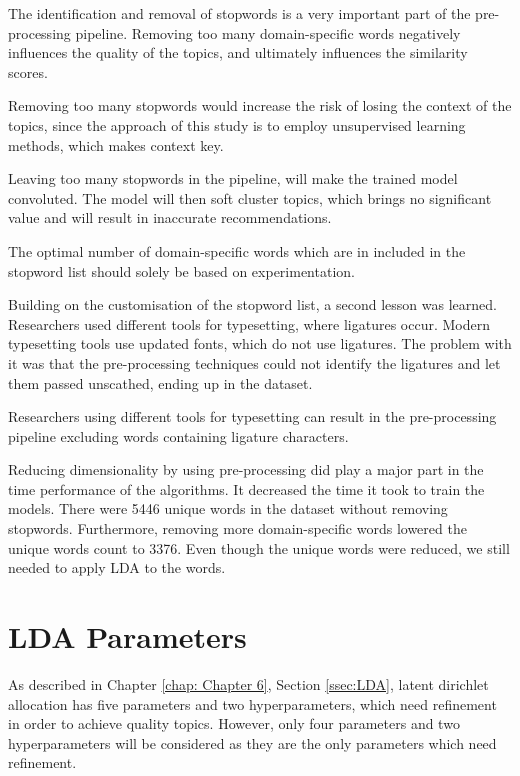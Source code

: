 \begin{lesson}
The identification and removal of stopwords is a very important part of the pre-processing pipeline. Removing too many domain-specific words negatively influences the quality of the topics, and ultimately influences the similarity scores.
\end{lesson}\label{L:goldilocks}

Removing too many stopwords would increase the risk of losing the context of the topics, since the approach of this study is to employ unsupervised learning methods, which makes context key.

Leaving too many stopwords in the pipeline, will make the trained model convoluted. The model will then soft cluster topics, which brings no significant value and will result in inaccurate recommendations.

The optimal number of domain-specific words which are in included in the stopword list should solely be based on experimentation.

Building on the customisation of the stopword list, a second lesson was learned. Researchers used different tools for typesetting, where ligatures occur. Modern typesetting tools use updated fonts, which do not use ligatures. The problem with it was that the pre-processing techniques could not identify the ligatures and let them passed unscathed, ending up in the dataset.

\begin{lesson}
Researchers using different tools for typesetting can result in the pre-processing pipeline excluding words containing ligature characters.
\end{lesson}\label{L:ligature}

Reducing dimensionality by using pre-processing did play a major part in the time performance of the algorithms. It decreased the time it took to train the models. There were 5446 unique words in the dataset without removing stopwords. Furthermore, removing more domain-specific words lowered the unique words count to 3376. Even though the unique words were reduced, we still needed to apply LDA to the words.

\section{LDA Parameters}

As described in Chapter \ref{chap: Chapter 6}, Section \ref{ssec:LDA}, latent dirichlet allocation has five parameters and two hyperparameters, which need refinement in order to achieve quality topics. However, only four parameters and two hyperparameters will be considered as they are the only parameters which need refinement.

